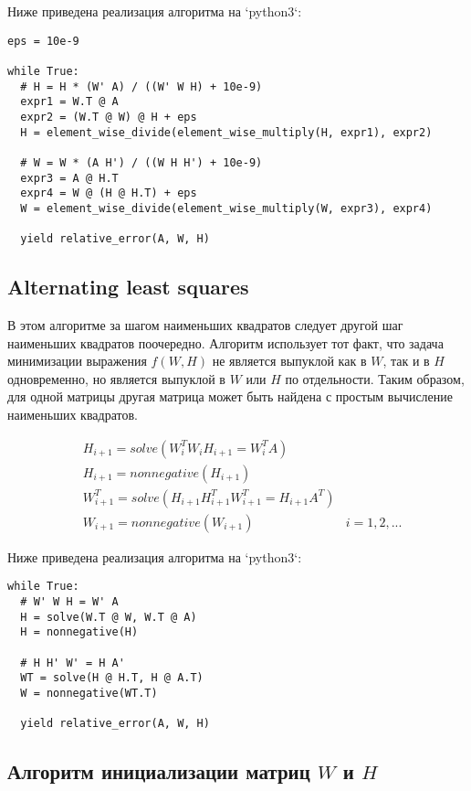 Ниже приведена реализация алгоритма на `python3`:

\verbatimfont{\small}
\begin{verbatim}
eps = 10e-9

while True:
  # H = H * (W' A) / ((W' W H) + 10e-9)
  expr1 = W.T @ A
  expr2 = (W.T @ W) @ H + eps
  H = element_wise_divide(element_wise_multiply(H, expr1), expr2)

  # W = W * (A H') / ((W H H') + 10e-9)
  expr3 = A @ H.T
  expr4 = W @ (H @ H.T) + eps
  W = element_wise_divide(element_wise_multiply(W, expr3), expr4)

  yield relative_error(A, W, H)
\end{verbatim}


\newpage


\subsection{Alternating least squares}

В этом алгоритме за шагом наименьших квадратов следует другой шаг наименьших квадратов поочередно. Алгоритм использует тот факт, что задача минимизации выражения $f(W, H)$ не является выпуклой как в $W$, так и в $H$ одновременно, но является выпуклой в $W$ или $H$ по отдельности. Таким образом, для одной матрицы другая матрица может быть найдена с простым вычисление наименьших квадратов.

\begin{align*}
	& H_{i+1} = solve(W_i^T W_i H_{i+1} = W_i^T A) \\
	& H_{i+1} = nonnegative(H_{i+1}) \\
	& W_{i+1}^T = solve(H_{i+1} H_{i+1}^T W_{i+1}^T = H_{i+1} A^T) \\
	& W_{i+1} = nonnegative(W_{i+1}) & i = 1, 2, ...
\end{align*}

Ниже приведена реализация алгоритма на `python3`:

\verbatimfont{\small}
\begin{verbatim}
while True:
  # W' W H = W' A
  H = solve(W.T @ W, W.T @ A)
  H = nonnegative(H)

  # H H' W' = H A'
  WT = solve(H @ H.T, H @ A.T)
  W = nonnegative(WT.T)

  yield relative_error(A, W, H)
\end{verbatim}


\newpage


\subsection{Алгоритм инициализации матриц $W$ и $H$}

